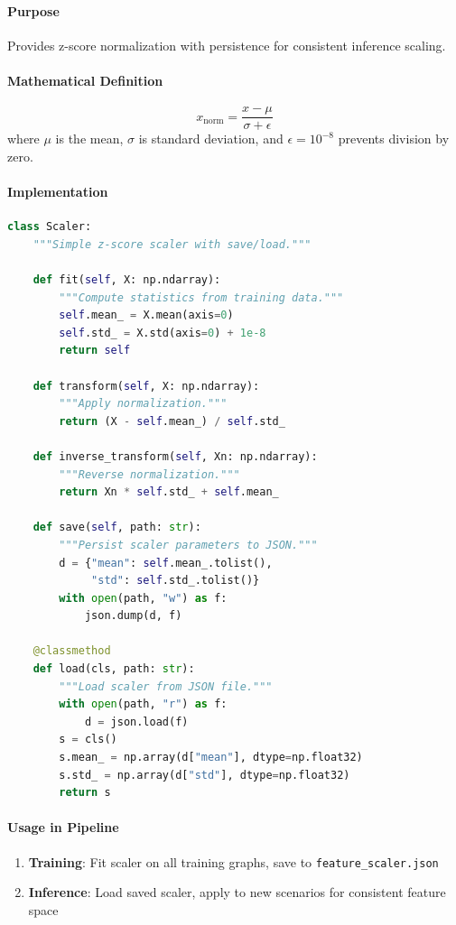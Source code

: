 \documentclass[12pt,a4paper]{article}
\begin{document}
\paragraph{Purpose}
Provides z-score normalization with persistence for consistent inference scaling.

\paragraph{Mathematical Definition}
\begin{equation}
x_{\text{norm}} = \frac{x - \mu}{\sigma + \epsilon}
\end{equation}
where $\mu$ is the mean, $\sigma$ is standard deviation, and $\epsilon = 10^{-8}$ prevents division by zero.

\paragraph{Implementation}
\begin{lstlisting}[language=Python]
class Scaler:
    """Simple z-score scaler with save/load."""
    
    def fit(self, X: np.ndarray):
        """Compute statistics from training data."""
        self.mean_ = X.mean(axis=0)
        self.std_ = X.std(axis=0) + 1e-8
        return self
    
    def transform(self, X: np.ndarray):
        """Apply normalization."""
        return (X - self.mean_) / self.std_
    
    def inverse_transform(self, Xn: np.ndarray):
        """Reverse normalization."""
        return Xn * self.std_ + self.mean_
    
    def save(self, path: str):
        """Persist scaler parameters to JSON."""
        d = {"mean": self.mean_.tolist(), 
             "std": self.std_.tolist()}
        with open(path, "w") as f:
            json.dump(d, f)
    
    @classmethod
    def load(cls, path: str):
        """Load scaler from JSON file."""
        with open(path, "r") as f:
            d = json.load(f)
        s = cls()
        s.mean_ = np.array(d["mean"], dtype=np.float32)
        s.std_ = np.array(d["std"], dtype=np.float32)
        return s
\end{lstlisting}

\paragraph{Usage in Pipeline}
\begin{enumerate}
    \item \textbf{Training}: Fit scaler on all training graphs, save to \texttt{feature\_scaler.json}
    \item \textbf{Inference}: Load saved scaler, apply to new scenarios for consistent feature space
\end{enumerate}
\end{document}
